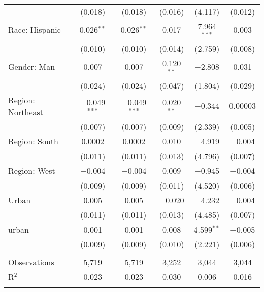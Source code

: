 \begin{tabular}{@{\extracolsep{5pt}}lccccc}
  & (0.018) & (0.018) & (0.016) & (4.117) & (0.012) \\ 
  Race: Hispanic & 0.026$^{**}$ & 0.026$^{**}$ & 0.017 & 7.964$^{***}$ & 0.003 \\ 
  & (0.010) & (0.010) & (0.014) & (2.759) & (0.008) \\ 
  Gender: Man & 0.007 & 0.007 & 0.120$^{**}$ & $-$2.808 & 0.031 \\ 
  & (0.024) & (0.024) & (0.047) & (1.804) & (0.029) \\ 
  Region: Northeast & $-$0.049$^{***}$ & $-$0.049$^{***}$ & 0.020$^{**}$ & $-$0.344 & 0.00003 \\ 
  & (0.007) & (0.007) & (0.009) & (2.339) & (0.005) \\ 
  Region: South & 0.0002 & 0.0002 & 0.010 & $-$4.919 & $-$0.004 \\ 
  & (0.011) & (0.011) & (0.013) & (4.796) & (0.007) \\ 
  Region: West & $-$0.004 & $-$0.004 & 0.009 & $-$0.945 & $-$0.004 \\ 
  & (0.009) & (0.009) & (0.011) & (4.520) & (0.006) \\ 
  Urban & 0.005 & 0.005 & $-$0.020 & $-$4.232 & $-$0.004 \\ 
  & (0.011) & (0.011) & (0.013) & (4.485) & (0.007) \\ 
  urban & 0.001 & 0.001 & 0.008 & 4.599$^{**}$ & $-$0.005 \\ 
  & (0.009) & (0.009) & (0.010) & (2.221) & (0.006) \\ 
 \hline \\[-1.8ex] 

Observations & 5,719 & 5,719 & 3,252 & 3,044 & 3,044 \\ 
R$^{2}$ & 0.023 & 0.023 & 0.030 & 0.006 & 0.016 \\ 
\hline 
\hline \\[-1.8ex] 
\end{tabular} 